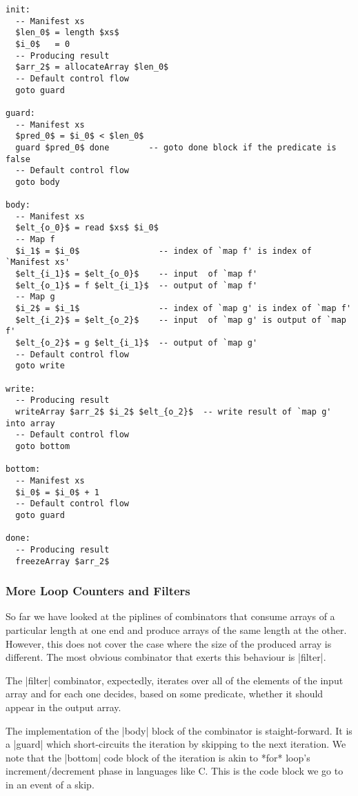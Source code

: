 \begin{lstlisting}[mathescape]
init:
  -- Manifest xs
  $len_0$ = length $xs$
  $i_0$   = 0
  -- Producing result
  $arr_2$ = allocateArray $len_0$
  -- Default control flow
  goto guard

guard:
  -- Manifest xs
  $pred_0$ = $i_0$ < $len_0$
  guard $pred_0$ done        -- goto done block if the predicate is false
  -- Default control flow
  goto body

body:
  -- Manifest xs
  $elt_{o_0}$ = read $xs$ $i_0$
  -- Map f
  $i_1$ = $i_0$                -- index of `map f' is index of `Manifest xs'
  $elt_{i_1}$ = $elt_{o_0}$    -- input  of `map f'
  $elt_{o_1}$ = f $elt_{i_1}$  -- output of `map f'
  -- Map g
  $i_2$ = $i_1$                -- index of `map g' is index of `map f'
  $elt_{i_2}$ = $elt_{o_2}$    -- input  of `map g' is output of `map f'
  $elt_{o_2}$ = g $elt_{i_1}$  -- output of `map g'
  -- Default control flow
  goto write

write:
  -- Producing result
  writeArray $arr_2$ $i_2$ $elt_{o_2}$  -- write result of `map g' into array
  -- Default control flow
  goto bottom

bottom:
  -- Manifest xs
  $i_0$ = $i_0$ + 1
  -- Default control flow
  goto guard

done:
  -- Producing result
  freezeArray $arr_2$
\end{lstlisting}


\subsubsection{\label{sec:Loop:Filt}More Loop Counters and Filters}

So far we have looked at the piplines of combinators that consume arrays of a particular length at one end and produce arrays of the same length at the other. However, this does not cover the case where the size of the produced array is different. The most obvious combinator that exerts this behaviour is |filter|.

The |filter| combinator, expectedly, iterates over all of the elements of the input array and for each one decides, based on some predicate, whether it should appear in the output array.

The implementation of the |body| block of the combinator is staight-forward. It is a |guard| which short-circuits the iteration by skipping to the next iteration. We note that the |bottom| code block of the iteration is akin to *for* loop's increment/decrement phase in languages like C. This is the code block we go to in an event of a skip.

